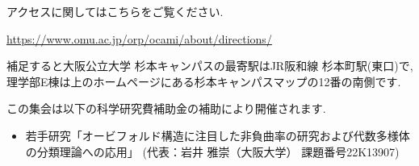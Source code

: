\documentclass[dvipdfmx,a4paper,12pt]{article}
\theoremstyle{plain} %
\theoremstyle{definition} %
\begin{document}

アクセスに関してはこちらをご覧ください. 
\begin{center}
\url{https://www.omu.ac.jp/orp/ocami/about/directions/}
\end{center}
補足すると大阪公立大学 杉本キャンパスの最寄駅はJR阪和線 杉本町駅(東口)で, 
理学部E棟は上のホームページにある杉本キャンパスマップの12番の南側です. 
  \vskip5mm


この集会は以下の科学研究費補助金の補助により開催されます.

\begin{itemize}
  \setlength{\parskip}{0cm} 
  \setlength{\itemsep}{0cm}
\item 若手研究「オービフォルド構造に注目した非負曲率の研究および代数多様体の分類理論への応用」
 (代表：岩井 雅崇（大阪大学） 課題番号22K13907)
  \end{itemize}
\end{document}
